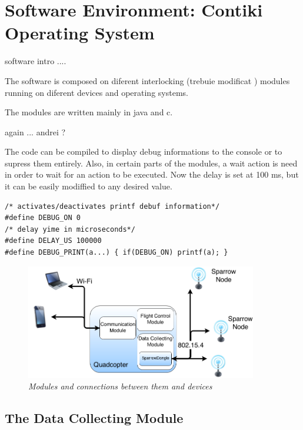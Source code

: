 \normalfont\normalsize
\chapter{Software Environment: Contiki Operating System}

software intro ....


The software is composed on diferent interlocking (trebuie modificat ) modules running on diferent devices and operating systems.

The modules are written mainly in java and c.

again ... andrei ?

The code can be compiled to display debug informations to the console or to supress them entirely. Also, in certain parts of the modules, a wait action is need in order to wait for an action to be executed. Now the delay is set at 100 ms, but it can be easily modiffied to any desired value.

\lstset{numbers=none, mathescape=true, nolol=false,caption=Data Collection use of mutex,label=lst:task}
\begin{lstlisting}
/* activates/deactivates printf debuf information*/
#define DEBUG_ON 0
/* delay yime in microseconds*/
#define DELAY_US 100000
#define DEBUG_PRINT(a...) { if(DEBUG_ON) printf(a); }
\end{lstlisting}

\begin{figure}[ht]
\begin{center}
\includegraphics[width=0.9\textwidth]{sw_platform/organigrama.png}
\end{center}
\caption{\small \itshape{Modules and connections between them and devices}}
\end{figure}


\clearpage

\section{The Data Collecting Module}
 
